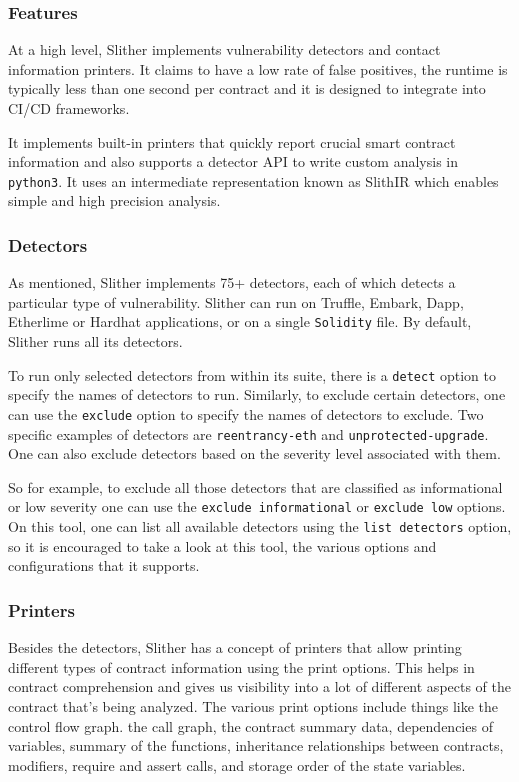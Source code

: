 \subsubsection{Features}\label{features}

At a high level, Slither implements vulnerability detectors and contact
information printers. It claims to have a low rate of false positives,
the runtime is typically less than one second per contract and it is
designed to integrate into CI/CD frameworks.

It implements built-in printers that quickly report crucial smart
contract information and also supports a detector API to write custom
analysis in \texttt{python3}. It uses an intermediate representation
known as SlithIR which enables simple and high precision analysis.

\subsubsection{Detectors}\label{detectors}

As mentioned, Slither implements 75+ detectors, each of which detects a
particular type of vulnerability. Slither can run on Truffle, Embark,
Dapp, Etherlime or Hardhat applications, or on a single
\texttt{Solidity} file. By default, Slither runs all its detectors.

To run only selected detectors from within its suite, there is a
\texttt{detect} option to specify the names of detectors to run.
Similarly, to exclude certain detectors, one can use the
\texttt{exclude} option to specify the names of detectors to exclude.
Two specific examples of detectors are \texttt{reentrancy-eth} and
\texttt{unprotected-upgrade}. One can also exclude detectors based on
the severity level associated with them.

So for example, to exclude all those detectors that are classified as
informational or low severity one can use the
\texttt{exclude\ informational} or \texttt{exclude\ low} options. On
this tool, one can list all available detectors using the
\texttt{list\ detectors} option, so it is encouraged to take a look at
this tool, the various options and configurations that it supports.

\subsubsection{Printers}\label{printers}

Besides the detectors, Slither has a concept of printers that allow
printing different types of contract information using the print
options. This helps in contract comprehension and gives us visibility
into a lot of different aspects of the contract that's being analyzed.
The various print options include things like the control flow graph.
the call graph, the contract summary data, dependencies of variables,
summary of the functions, inheritance relationships between contracts,
modifiers, require and assert calls, and storage order of the state
variables.

